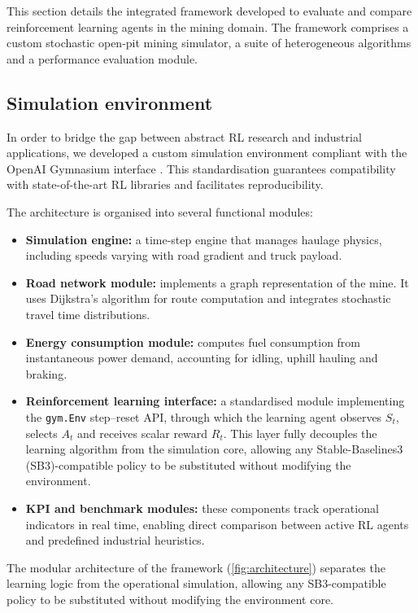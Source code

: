 \documentclass[11pt,a4paper]{article}
\begin{document}
This section details the integrated framework developed to evaluate and compare reinforcement learning agents in the mining domain. The framework comprises a custom stochastic open-pit mining simulator, a suite of heterogeneous algorithms and a performance evaluation module.

\subsection{Simulation environment}

In order to bridge the gap between abstract RL research and industrial applications, we developed a custom simulation environment compliant with the OpenAI Gymnasium interface \cite{MarkTowers2025}. This standardisation guarantees compatibility with state-of-the-art RL libraries \cite{AntoninRaffin2021} and facilitates reproducibility.

The architecture is organised into several functional modules:

\begin{itemize}
  \item \textbf{Simulation engine:} a time-step engine that manages haulage physics, including speeds varying with road gradient and truck payload.
  \item \textbf{Road network module:} implements a graph representation of the mine. It uses Dijkstra's algorithm for route computation and integrates stochastic travel time distributions.
  \item \textbf{Energy consumption module:} computes fuel consumption from instantaneous power demand, accounting for idling, uphill hauling and braking.
  \item \textbf{Reinforcement learning interface:} a standardised module implementing the \texttt{gym.Env} step--reset API, through which the learning agent observes $S_t$, selects $A_t$ and receives scalar reward $R_t$. This layer fully decouples the learning algorithm from the simulation core, allowing any Stable-Baselines3 (SB3)-compatible policy to be substituted without modifying the environment.
  \item \textbf{KPI and benchmark modules:} these components track operational indicators in real time, enabling direct comparison between active RL agents and predefined industrial heuristics.
\end{itemize}

The modular architecture of the framework (\cref{fig:architecture}) separates the learning logic from the operational simulation, allowing any SB3-compatible policy to be substituted without modifying the environment core.
\end{document}
